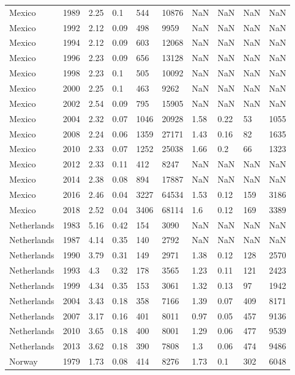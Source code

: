 \begin{tabular}{llllllllll}
Mexico & 1989 & 2.25 & 0.1 & 544 & 10876 & NaN & NaN & NaN & NaN \\ 
Mexico & 1992 & 2.12 & 0.09 & 498 & 9959 & NaN & NaN & NaN & NaN \\ 
Mexico & 1994 & 2.12 & 0.09 & 603 & 12068 & NaN & NaN & NaN & NaN \\ 
Mexico & 1996 & 2.23 & 0.09 & 656 & 13128 & NaN & NaN & NaN & NaN \\ 
Mexico & 1998 & 2.23 & 0.1 & 505 & 10092 & NaN & NaN & NaN & NaN \\ 
Mexico & 2000 & 2.25 & 0.1 & 463 & 9262 & NaN & NaN & NaN & NaN \\ 
Mexico & 2002 & 2.54 & 0.09 & 795 & 15905 & NaN & NaN & NaN & NaN \\ 
Mexico & 2004 & 2.32 & 0.07 & 1046 & 20928 & 1.58 & 0.22 & 53 & 1055 \\ 
Mexico & 2008 & 2.24 & 0.06 & 1359 & 27171 & 1.43 & 0.16 & 82 & 1635 \\ 
Mexico & 2010 & 2.33 & 0.07 & 1252 & 25038 & 1.66 & 0.2 & 66 & 1323 \\ 
Mexico & 2012 & 2.33 & 0.11 & 412 & 8247 & NaN & NaN & NaN & NaN \\ 
Mexico & 2014 & 2.38 & 0.08 & 894 & 17887 & NaN & NaN & NaN & NaN \\ 
Mexico & 2016 & 2.46 & 0.04 & 3227 & 64534 & 1.53 & 0.12 & 159 & 3186 \\ 
Mexico & 2018 & 2.52 & 0.04 & 3406 & 68114 & 1.6 & 0.12 & 169 & 3389 \\ 
Netherlands & 1983 & 5.16 & 0.42 & 154 & 3090 & NaN & NaN & NaN & NaN \\ 
Netherlands & 1987 & 4.14 & 0.35 & 140 & 2792 & NaN & NaN & NaN & NaN \\ 
Netherlands & 1990 & 3.79 & 0.31 & 149 & 2971 & 1.38 & 0.12 & 128 & 2570 \\ 
Netherlands & 1993 & 4.3 & 0.32 & 178 & 3565 & 1.23 & 0.11 & 121 & 2423 \\ 
Netherlands & 1999 & 4.34 & 0.35 & 153 & 3061 & 1.32 & 0.13 & 97 & 1942 \\ 
Netherlands & 2004 & 3.43 & 0.18 & 358 & 7166 & 1.39 & 0.07 & 409 & 8171 \\ 
Netherlands & 2007 & 3.17 & 0.16 & 401 & 8011 & 0.97 & 0.05 & 457 & 9136 \\ 
Netherlands & 2010 & 3.65 & 0.18 & 400 & 8001 & 1.29 & 0.06 & 477 & 9539 \\ 
Netherlands & 2013 & 3.62 & 0.18 & 390 & 7808 & 1.3 & 0.06 & 474 & 9486 \\ 
Norway & 1979 & 1.73 & 0.08 & 414 & 8276 & 1.73 & 0.1 & 302 & 6048 \\ 

\end{tabular}
